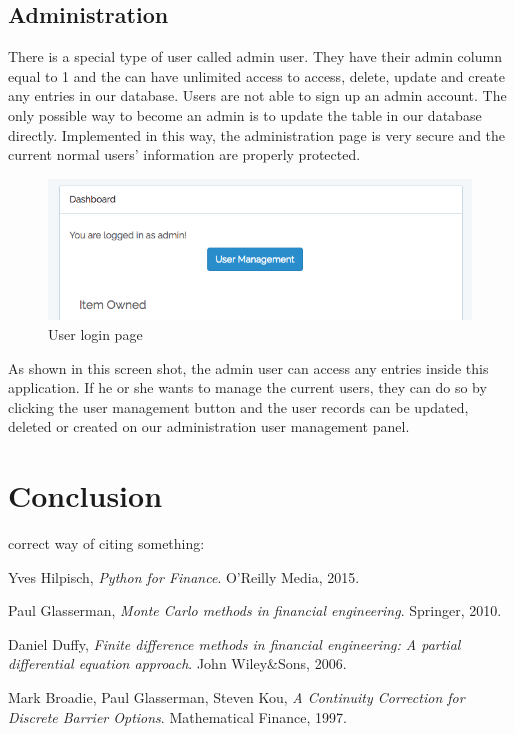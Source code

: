 \subsection{Administration}
There is a special type of user called admin user. They have their admin column equal to 1 and the can have unlimited access to access, delete, update and create any entries in our database. Users are not able to sign up an admin account. The only possible way to become an admin is to update the table in our database directly. Implemented in this way, the administration page is very secure and the current normal users' information are properly protected.
\begin{figure}[h]
      \centering
	\includegraphics[scale=0.3]{admin.png}
      \caption{User login page}
\end{figure}
As shown in this screen shot, the admin user can access any entries inside this application. If he or she wants to manage the current users, they can do so by clicking the user management button and the user records can be updated, deleted or created on our administration user management panel.

\newpage

\section{Conclusion}

correct way of citing something: \cite{PythonForFinance}

\newpage
\begin{thebibliography}{9}
Yves Hilpisch,
\textit{Python for Finance}. 
O'Reilly Media, 2015.
 
Paul Glasserman,
\textit{Monte Carlo methods in financial engineering}.
Springer, 2010.

Daniel Duffy,
\textit{Finite difference methods in financial engineering: A partial differential equation approach}.
John Wiley\&Sons, 2006.

Mark Broadie, Paul Glasserman, Steven Kou,
\textit{A Continuity Correction for Discrete Barrier Options}.
Mathematical Finance, 1997.

\end{thebibliography}
